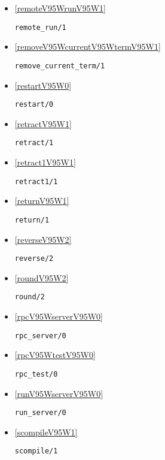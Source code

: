 \begin{itemize}
\item \ref{remoteV95WrunV95W1} 
\begin{verbatim}
remote_run/1
\end{verbatim}

\item \ref{removeV95WcurrentV95WtermV95W1} 
\begin{verbatim}
remove_current_term/1
\end{verbatim}

\item \ref{restartV95W0} 
\begin{verbatim}
restart/0
\end{verbatim}

\item \ref{retractV95W1} 
\begin{verbatim}
retract/1
\end{verbatim}

\item \ref{retract1V95W1} 
\begin{verbatim}
retract1/1
\end{verbatim}

\item \ref{returnV95W1} 
\begin{verbatim}
return/1
\end{verbatim}

\item \ref{reverseV95W2} 
\begin{verbatim}
reverse/2
\end{verbatim}

\item \ref{roundV95W2} 
\begin{verbatim}
round/2
\end{verbatim}

\item \ref{rpcV95WserverV95W0} 
\begin{verbatim}
rpc_server/0
\end{verbatim}

\item \ref{rpcV95WtestV95W0} 
\begin{verbatim}
rpc_test/0
\end{verbatim}

\item \ref{runV95WserverV95W0} 
\begin{verbatim}
run_server/0
\end{verbatim}

\item \ref{scompileV95W1} 
\begin{verbatim}
scompile/1
\end{verbatim}


\end{itemize}
